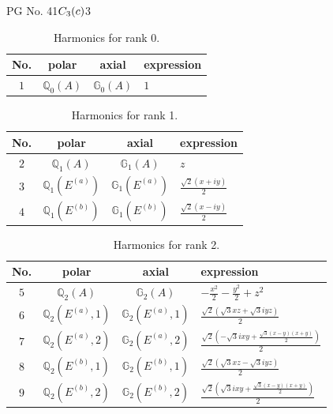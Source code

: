\documentclass[fleqn,8pt,landscape]{jsarticle}
\begin{document}
\setcounter{MaxMatrixCols}{32}

\renewcommand{\tablename}{Table~}
\renewcommand{\figurename}{Figure~}
\begin{center}
\LARGE
PG No. 41\quad$C_{\rm 3}(c)$\quad$3$\quad[ trigonal ]
\end{center}
\begin{table}[ht!]
\begin{center}
\caption{Harmonics for rank 0.}
\renewcommand{\arraystretch}{1.3}
\begin{tabular}{cccl} \hline \hline
No. & polar & axial & expression \\ \hline
$ 1 $ & $ \mathbb{Q}_{0}(A) $ & $ \mathbb{G}_{0}(A) $ & $ 1 $ \\
 \hline \hline
\end{tabular}
\end{center}
\end{table}
\begin{table}[ht!]
\begin{center}
\caption{Harmonics for rank 1.}
\renewcommand{\arraystretch}{1.3}
\begin{tabular}{cccl} \hline \hline
No. & polar & axial & expression \\ \hline
$ 2 $ & $ \mathbb{Q}_{1}(A) $ & $ \mathbb{G}_{1}(A) $ & $ z $ \\
$ 3 $ & $ \mathbb{Q}_{1}(E^{(a)}) $ & $ \mathbb{G}_{1}(E^{(a)}) $ & $ \frac{\sqrt{2} \left(x + i y\right)}{2} $ \\
$ 4 $ & $ \mathbb{Q}_{1}(E^{(b)}) $ & $ \mathbb{G}_{1}(E^{(b)}) $ & $ \frac{\sqrt{2} \left(x - i y\right)}{2} $ \\
 \hline \hline
\end{tabular}
\end{center}
\end{table}
\begin{table}[ht!]
\begin{center}
\caption{Harmonics for rank 2.}
\renewcommand{\arraystretch}{1.3}
\begin{tabular}{cccl} \hline \hline
No. & polar & axial & expression \\ \hline
$ 5 $ & $ \mathbb{Q}_{2}(A) $ & $ \mathbb{G}_{2}(A) $ & $ - \frac{x^{2}}{2} - \frac{y^{2}}{2} + z^{2} $ \\
$ 6 $ & $ \mathbb{Q}_{2}(E^{(a)},1) $ & $ \mathbb{G}_{2}(E^{(a)},1) $ & $ \frac{\sqrt{2} \left(\sqrt{3} x z + \sqrt{3} i y z\right)}{2} $ \\
$ 7 $ & $ \mathbb{Q}_{2}(E^{(a)},2) $ & $ \mathbb{G}_{2}(E^{(a)},2) $ & $ \frac{\sqrt{2} \left(- \sqrt{3} i x y + \frac{\sqrt{3} \left(x - y\right) \left(x + y\right)}{2}\right)}{2} $ \\
$ 8 $ & $ \mathbb{Q}_{2}(E^{(b)},1) $ & $ \mathbb{G}_{2}(E^{(b)},1) $ & $ \frac{\sqrt{2} \left(\sqrt{3} x z - \sqrt{3} i y z\right)}{2} $ \\
$ 9 $ & $ \mathbb{Q}_{2}(E^{(b)},2) $ & $ \mathbb{G}_{2}(E^{(b)},2) $ & $ \frac{\sqrt{2} \left(\sqrt{3} i x y + \frac{\sqrt{3} \left(x - y\right) \left(x + y\right)}{2}\right)}{2} $ \\
 \hline \hline
\end{tabular}
\end{center}
\end{table}
\end{document}
